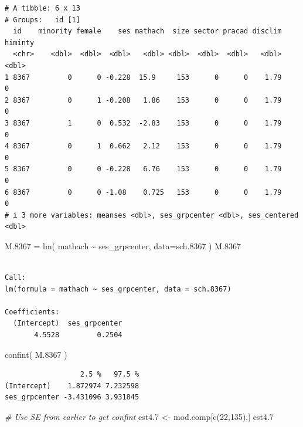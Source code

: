 \documentclass[
  letterpaper,
  DIV=11,
  numbers=noendperiod]{scrreprt}
\newenvironment{Shaded}{\begin{snugshade}}{\end{snugshade}}
\newcommand{\AttributeTok}[1]{\textcolor[rgb]{0.49,0.56,0.16}{#1}}
\newcommand{\CommentTok}[1]{\textcolor[rgb]{0.38,0.63,0.69}{\textit{#1}}}
\newcommand{\DecValTok}[1]{\textcolor[rgb]{0.25,0.63,0.44}{#1}}
\newcommand{\FloatTok}[1]{\textcolor[rgb]{0.25,0.63,0.44}{#1}}
\newcommand{\FunctionTok}[1]{\textcolor[rgb]{0.02,0.16,0.49}{#1}}
\newcommand{\NormalTok}[1]{\textcolor[rgb]{0.00,0.44,0.13}{#1}}
\newcommand{\OtherTok}[1]{\textcolor[rgb]{0.00,0.44,0.13}{#1}}
\newcommand{\SpecialCharTok}[1]{\textcolor[rgb]{0.25,0.44,0.63}{#1}}
\begin{document}
\begin{verbatim}
# A tibble: 6 x 13
# Groups:   id [1]
  id    minority female    ses mathach  size sector pracad disclim himinty
  <chr>    <dbl>  <dbl>  <dbl>   <dbl> <dbl>  <dbl>  <dbl>   <dbl>   <dbl>
1 8367         0      0 -0.228  15.9     153      0      0    1.79       0
2 8367         0      1 -0.208   1.86    153      0      0    1.79       0
3 8367         1      0  0.532  -2.83    153      0      0    1.79       0
4 8367         0      1  0.662   2.12    153      0      0    1.79       0
5 8367         0      0 -0.228   6.76    153      0      0    1.79       0
6 8367         0      0 -1.08    0.725   153      0      0    1.79       0
# i 3 more variables: meanses <dbl>, ses_grpcenter <dbl>, ses_centered <dbl>
\end{verbatim}

\begin{Shaded}
\begin{Highlighting}[]
\NormalTok{M}\FloatTok{.8367} \OtherTok{=} \FunctionTok{lm}\NormalTok{( mathach }\SpecialCharTok{\textasciitilde{}}\NormalTok{ ses\_grpcenter, }\AttributeTok{data=}\NormalTok{sch}\FloatTok{.8367}\NormalTok{ )}
\NormalTok{M}\FloatTok{.8367}
\end{Highlighting}
\end{Shaded}

\begin{verbatim}

Call:
lm(formula = mathach ~ ses_grpcenter, data = sch.8367)

Coefficients:
  (Intercept)  ses_grpcenter  
       4.5528         0.2504  
\end{verbatim}

\begin{Shaded}
\begin{Highlighting}[]
\FunctionTok{confint}\NormalTok{( M}\FloatTok{.8367}\NormalTok{ )}
\end{Highlighting}
\end{Shaded}

\begin{verbatim}
                  2.5 %   97.5 %
(Intercept)    1.872974 7.232598
ses_grpcenter -3.431096 3.931845
\end{verbatim}

\begin{Shaded}
\begin{Highlighting}[]
\CommentTok{\# Use SE from earlier to get confint}
\NormalTok{est4}\FloatTok{.7} \OtherTok{\textless{}{-}}\NormalTok{ mod.comp[}\FunctionTok{c}\NormalTok{(}\DecValTok{22}\NormalTok{,}\DecValTok{135}\NormalTok{),]}
\NormalTok{est4}\FloatTok{.7}
\end{Highlighting}
\end{Shaded}
\end{document}
